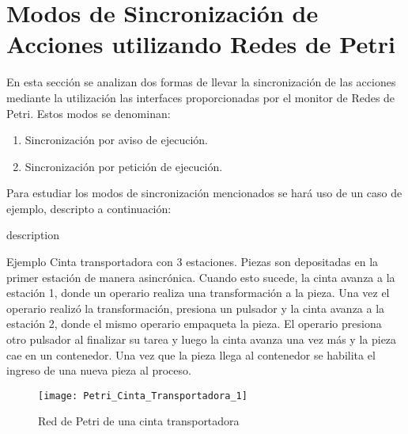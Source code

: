 \section{Modos de Sincronización de Acciones utilizando Redes de Petri}
\label{sec:sincronizacion_cinta_transportadora}
En esta sección se analizan dos formas de llevar la sincronización de las
acciones mediante la utilización las interfaces proporcionadas por el monitor de
Redes de Petri. Estos modos se denominan:
\begin{enumerate}
  \item Sincronización por aviso de ejecución.
  \item Sincronización por petición de ejecución.
\end{enumerate}

Para estudiar los modos de sincronización mencionados se hará uso de un caso de
ejemplo, descripto a continuación:

\begin{labeling}{description}
\item [Ejemplo]
Cinta transportadora con 3 estaciones. Piezas son depositadas en la primer
estación de manera asincrónica. Cuando esto sucede, la cinta avanza a la
estación 1, donde un operario realiza una transformación a la pieza. Una vez el
operario realizó la transformación, presiona un pulsador y la cinta avanza a la
estación 2, donde el mismo operario empaqueta la pieza. El operario
presiona otro pulsador al finalizar su tarea y luego la cinta avanza una vez
más y la pieza cae en un contenedor. Una vez que la pieza llega al contenedor se
habilita el ingreso de una nueva pieza al proceso.
\end{labeling}

\begin{figure}[H]
    \centering
    \texttt{[image: Petri\_Cinta\_Transportadora\_1]}
    \caption{Red de Petri de una cinta transportadora}
    \label{fig:petri_cinta_transportadora_1}
\end{figure}


